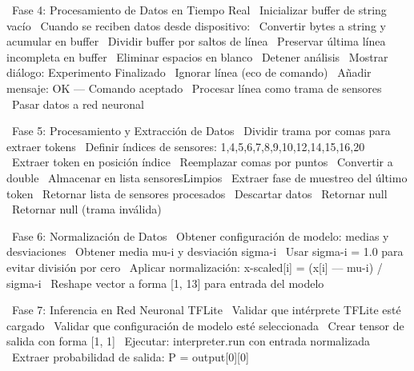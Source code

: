 \begin{algorithmic}[1]
\State~Fase 4: Procesamiento de Datos en Tiempo Real
\State~Inicializar buffer de string vacío
\State~Cuando se reciben datos desde dispositivo:
\State~Convertir bytes a string y acumular en buffer
    \State~Dividir buffer por saltos de línea
    \State~Preservar última línea incompleta en buffer
        \State~Eliminar espacios en blanco
            \State~Detener análisis
            \State~Mostrar diálogo: Experimento Finalizado
        \EndIf%
            \State~Ignorar línea (eco de comando)
        \EndIf%
            \State~Añadir mensaje: OK --- Comando aceptado
        \Else%
            \State~Procesar línea como trama de sensores
                \State~Pasar datos a red neuronal
            \EndIf%
        \EndIf%
    \EndFor%
\EndIf%

\State~Fase 5: Procesamiento y Extracción de Datos
\State~Dividir trama por comas para extraer tokens
    \State~Definir índices de sensores: 1,4,5,6,7,8,9,10,12,14,15,16,20
        \State~Extraer token en posición índice
        \State~Reemplazar comas por puntos
        \State~Convertir a double
        \State~Almacenar en lista sensoresLimpios
    \EndFor%
    \State~Extraer fase de muestreo del último token
        \State~Retornar lista de sensores procesados
    \Else%
        \State~Descartar datos
        \State~Retornar null
    \EndIf%
\Else%
    \State~Retornar null (trama inválida)
\EndIf%

\State~Fase 6: Normalización de Datos
\State~Obtener configuración de modelo: medias y desviaciones
    \State~Obtener media mu-i y desviación sigma-i
        \State~Usar sigma-i = 1.0 para evitar división por cero
    \EndIf%
    \State~Aplicar normalización: x-scaled[i] = (x[i] --- mu-i) / sigma-i
\EndFor%
\State~Reshape vector a forma [1, 13] para entrada del modelo

\State~Fase 7: Inferencia en Red Neuronal TFLite
\State~Validar que intérprete TFLite esté cargado
\State~Validar que configuración de modelo esté seleccionada
\State~Crear tensor de salida con forma [1, 1]
\State~Ejecutar: interpreter.run con entrada normalizada
\State~Extraer probabilidad de salida: P = output[0][0]


\end{algorithmic}
